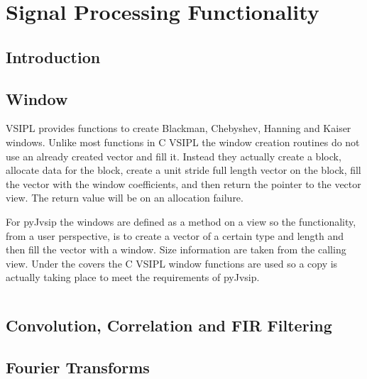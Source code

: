 \chapter{Signal Processing Functionality}
\section*{Introduction}
\section*{Window}
VSIPL provides functions to create Blackman, Chebyshev, Hanning and Kaiser windows. Unlike most functions in C VSIPL the window creation routines do not use an already created vector and fill it. Instead they actually create a block, allocate data for the block, create a unit stride full length vector on the block, fill the vector with the window coefficients, and then return the pointer to the vector view. The return value will be  on an allocation failure.

For pyJvsip the windows are defined as a method on a view so the functionality, from a user perspective, is to create a vector of a certain type and length and then fill the vector with a window.  Size information are taken from the calling view. Under the covers the C VSIPL window functions are used so a copy is actually taking place to meet the requirements of pyJvsip.

\newpage
\cex
\inputminted[linenos=true,resetmargins=true]{c}{./c_examples/example18.c}
\newpage
\section*{Convolution, Correlation and FIR Filtering}
\section*{Fourier Transforms}

